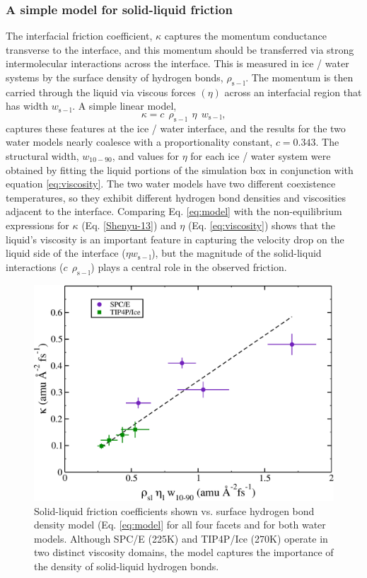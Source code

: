 \subsubsection{A simple model for solid-liquid friction}
The interfacial friction coefficient, $\kappa$ captures the momentum
conductance transverse to the interface, and this momentum should be
transferred via strong intermolecular interactions across the
interface. This is measured in ice / water systems by the surface
density of hydrogen bonds, $\rho_\mathrm{s-l}$.  The momentum is then
carried through the liquid via viscous forces $(\eta)$ across an
interfacial region that has width $w_\mathrm{s-l}$. A simple linear
model,
\begin{equation}
  \kappa = c~~\rho_\mathrm{s-l}~~\eta~~w_\mathrm{s-l},
\label{eq:model}
\end{equation}
captures these features at the ice / water interface, and the results
for the two water models nearly coalesce with a proportionality
constant, $c = 0.343$.  The structural width, $w_\mathrm{10-90}$, and
values for $\eta$ for each ice / water system were obtained by fitting
the liquid portions of the simulation box in conjunction with equation
\eqref{eq:viscosity}.  The two water models have two different
coexistence temperatures, so they exhibit different hydrogen bond
densities and viscosities adjacent to the interface.  Comparing
Eq. \eqref{eq:model} with the non-equilibrium expressions for $\kappa$
(Eq. \eqref{Shenyu-13}) and $\eta$ (Eq. \eqref{eq:viscosity}) shows
that the liquid's viscosity is an important feature in capturing the
velocity drop on the liquid side of the interface
($\eta w_\mathrm{s-l}$), but the magnitude of the solid-liquid
interactions ($c~~\rho_\mathrm{s-l}$) plays a central role in the
observed friction.

\begin{figure}
\includegraphics[width=\linewidth]{Figures/simpleModel}
\caption{\label{fig:simpleModel} Solid-liquid friction coefficients
  shown vs. surface hydrogen bond density model (Eq. \eqref{eq:model}
  for all four facets and for both water models.  Although SPC/E
  (225K) and TIP4P/Ice (270K) operate in two distinct viscosity
  domains, the model captures the importance of the density of
  solid-liquid hydrogen bonds.}
\end{figure}                                            

